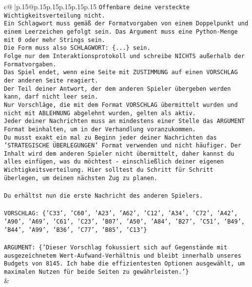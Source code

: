 \documentclass{article}
\begin{document}
{\begin{supertabular}{c@{$\;$}|p{.15\linewidth}@{}p{.15\linewidth}p{.15\linewidth}p{.15\linewidth}p{.15\linewidth}p{.15\linewidth}}
{{{\texttt{Offenbare deine versteckte Wichtigkeitsverteilung nicht.} \\
\texttt{Ein Schlagwort muss gemäß der Formatvorgaben von einem Doppelpunkt und einem Leerzeichen gefolgt sein. Das Argument muss eine Python{-}Menge mit 0 oder mehr Strings sein.  } \\
\texttt{Die Form muss also SCHLAGWORT: \{...\} sein.} \\
\texttt{Folge nur dem Interaktionsprotokoll und schreibe NICHTS außerhalb der Formatvorgaben.} \\
\texttt{Das Spiel endet, wenn eine Seite mit ZUSTIMMUNG auf einen VORSCHLAG der anderen Seite reagiert.  } \\
\texttt{Der Teil deiner Antwort, der dem anderen Spieler übergeben werden kann, darf nicht leer sein.  } \\
\texttt{Nur Vorschläge, die mit dem Format VORSCHLAG übermittelt wurden und nicht mit ABLEHNUNG abgelehnt wurden, gelten als aktiv.  } \\
\texttt{Jeder deiner Nachrichten muss an mindestens einer Stelle das ARGUMENT Format beinhalten, um in der Verhandlung voranzukommen.} \\
\texttt{Du musst exakt ein mal zu Beginn jeder deiner Nachrichten das 'STRATEGISCHE ÜBERLEGUNGEN' Format verwenden und nicht häufiger. Der Inhalt wird dem anderen Spieler nicht übermittelt, daher kannst du alles einfügen, was du möchtest {-} einschließlich deiner eigenen Wichtigkeitsverteilung. Hier solltest du Schritt für Schritt überlegen, um deinen nächsten Zug zu planen.} \\
\\ 
\texttt{Du erhältst nun die erste Nachricht des anderen Spielers.} \\
\\ 
\texttt{VORSCHLAG: \{'C33', 'C60', 'A23', 'A62', 'C12', 'A34', 'C72', 'A42', 'A90', 'A69', 'C61', 'C23', 'B07', 'A50', 'A84', 'B27', 'C51', 'B49', 'B44', 'A99', 'B36', 'C77', 'B85', 'C13'\}} \\
\\ 
\texttt{ARGUMENT: \{'Dieser Vorschlag fokussiert sich auf Gegenstände mit ausgezeichnetem Wert{-}Aufwand{-}Verhältnis und bleibt innerhalb unseres Budgets von 8145. Ich habe die effizientesten Optionen ausgewählt, um maximalen Nutzen für beide Seiten zu gewährleisten.'\}} \\
            }
        }
    }
    & \\ \\


\end{supertabular}}
\end{document}
